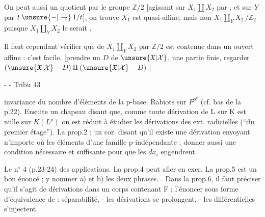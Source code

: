 On peut aussi  un quotient par le groupe $\mathbb Z/2$ [agissant sur $X_1\amalg X_2$ par , et sur $Y$ par $t\mathbin{\unsure{-|\to}}1/t$], on trouve
 $X_1$ est quasi-affine,  mais non $X_1\amalg_Y X_2\,/\mathbb Z_2$ puisque $X_1\amalg_Y X_2$ le serait .

Il faut cependant vérifier que     de $X_1\amalg_Y X_2$ par $\mathbb Z/2$ est contenue dans un ouvert affine : c'est facile.
[prendre un  $D$ de $\unsure{\mathfrak X|\mathcal X}$,   une partie finie, regarder $(\unsure{\mathfrak X|\mathcal X}-D)\amalg(\unsure{\mathfrak X|\mathcal X}-D)$.]

-  -
Tribu 43

invariance du nombre d'éléments de la p-base. Rabiots sur $F^{p^k}$ (cf. bas de la p.22). Ensuite un chapeau disant que, comme toute dérivation de L sur K est nulle sur $K(L^p)$ on est réduit à étudier les dérivations des ext. radicielles (``du premier étage''). La prop.2 ; un cor. disant qu'il existe une dérivation envoyant n'importe où les éléments d'une famille p-indépendante ; donner aussi une condition nécessaire et suffisante pour que les $dx_i$ engendrent.

Le n$^\circ$ 4 (p.23-24) des applications. La prop.4 peut aller en exer. La prop.5 est un bon énoncé ; y nommer a) et b) les deux phrases. . Dans la prop.6, il faut préciser qu'il s'agit de dérivations dans un corps contenant F ; l'énoncer sous forme d'équivalence de : séparabilité, - les dérivations se prolongent, - les différentielles s'injectent.

